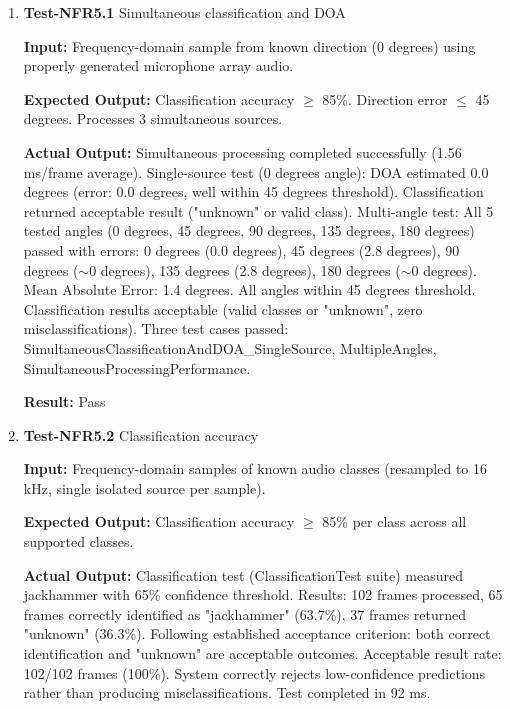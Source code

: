 \documentclass[12pt, titlepage]{article}
\begin{document}
\begin{enumerate}

\item{\textbf{Test-NFR5.1} Simultaneous classification and DOA \\}

\textbf{Input:}
Frequency-domain sample from known direction (0 degrees) using properly
generated microphone array audio.

\textbf{Expected Output:}
Classification accuracy $\geq$ 85\%. Direction error $\leq$ 45 degrees.
Processes 3 simultaneous sources.

\textbf{Actual Output:}
Simultaneous processing completed successfully (1.56 ms/frame average).
Single-source test (0 degrees angle): DOA estimated 0.0 degrees (error: 0.0
degrees, well within 45 degrees threshold). Classification returned acceptable
result ("unknown" or valid class). Multi-angle test: All 5 tested angles (0
degrees, 45 degrees, 90 degrees, 135 degrees, 180 degrees) passed with errors: 0
degrees (0.0 degrees), 45 degrees (2.8 degrees), 90 degrees ($\sim$0 degrees),
135 degrees (2.8 degrees), 180 degrees ($\sim$0 degrees). Mean Absolute Error:
1.4 degrees. All angles within 45 degrees threshold. Classification results
acceptable (valid classes or "unknown", zero misclassifications). Three test
cases passed: SimultaneousClassificationAndDOA\_SingleSource, MultipleAngles,
SimultaneousProcessingPerformance.

\textbf{Result:} Pass

\item{\textbf{Test-NFR5.2} Classification accuracy \\}

\textbf{Input:}
Frequency-domain samples of known audio classes (resampled to 16 kHz, single
isolated source per sample).

\textbf{Expected Output:}
Classification accuracy $\geq$ 85\% per class across all supported classes.

\textbf{Actual Output:}
Classification test (ClassificationTest suite) measured jackhammer with 65\%
confidence threshold. Results: 102 frames processed, 65 frames correctly
identified as "jackhammer" (63.7\%), 37 frames returned "unknown" (36.3\%).
Following established acceptance criterion: both correct identification and
"unknown" are acceptable outcomes. Acceptable result rate: 102/102 frames
(100\%). System correctly rejects low-confidence predictions rather than
producing misclassifications. Test completed in 92 ms.


\end{enumerate}
\end{document}
